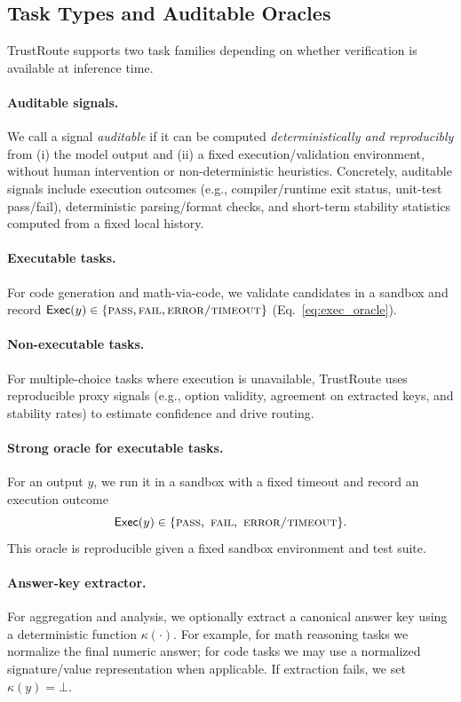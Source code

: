 \documentclass[acmsmall,screen,review,anonymous]{acmart}
\begin{document}
\subsection{Task Types and Auditable Oracles}
TrustRoute supports two task families depending on whether verification is available at inference time.

\paragraph{Auditable signals.}
We call a signal \emph{auditable} if it can be computed \emph{deterministically and reproducibly} from (i) the model output and (ii) a fixed execution/validation environment, without human intervention or non-deterministic heuristics.
Concretely, auditable signals include execution outcomes (e.g., compiler/runtime exit status, unit-test pass/fail), deterministic parsing/format checks, and short-term stability statistics computed from a fixed local history.


\paragraph{Executable tasks.}
For code generation and math-via-code, we validate candidates in a sandbox and record $\mathsf{Exec}(y)\in\{\textsc{pass},\textsc{fail},\textsc{error/timeout}\}$ (Eq.~\ref{eq:exec_oracle}).

\paragraph{Non-executable tasks.}
For multiple-choice tasks where execution is unavailable, TrustRoute uses reproducible proxy signals (e.g., option validity, agreement on extracted keys, and stability rates) to estimate confidence and drive routing.


\paragraph{Strong oracle for executable tasks.}
For an output $y$, we run it in a sandbox with a fixed timeout and record an execution outcome
\begin{equation}
\mathsf{Exec}(y)\in\{\textsc{pass},\ \textsc{fail},\ \textsc{error/timeout}\}.
\label{eq:exec_oracle}
\end{equation}
This oracle is reproducible given a fixed sandbox environment and test suite.

\paragraph{Answer-key extractor.}
For aggregation and analysis, we optionally extract a canonical answer key using a deterministic function $\kappa(\cdot)$.
For example, for math reasoning tasks we normalize the final numeric answer; for code tasks we may use a normalized signature/value representation when applicable.
If extraction fails, we set $\kappa(y)=\bot$.
\end{document}

